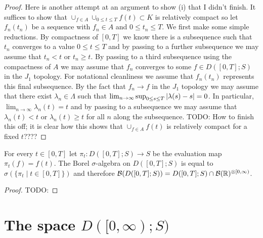 \begin{proof}
Here is another attempt at an argument to show (i) that I didn't finish.  It suffices to show that $\cup_{f \in A} \cup_{0 \leq t \leq T} f(t) \subset K$ is relatively compact so let $f_n(t_n)$ be a sequence with $f_n \in A$ and $0 \leq t_n \leq T$.  We first make some simple reductions.  By compactness of $[0,T]$ we know there is a subsequence such that $t_n$ converges to a value $0 \leq t \leq T$ and by passing to a further subsequence we may assume that $t_n < t$ or $t_n \geq t$.  By passing to a third subsequence using the compactness of $A$ we may assume that $f_n$ converges to some $f \in D([0,T];S)$ in the $J_1$ topology.  For notational cleanliness we assume that $f_n(t_n)$ represents this final subsequence.  By the fact that $f_n \to f$ in the $J_1$ topology we may assume that there exist $\lambda_n \in \Lambda$ such that $\lim_{n \to \infty} \sup_{0 \leq s \leq T} \left \vert \lambda(s) - s \right \vert = 0$.  In particular, $\lim_{n \to \infty} \lambda_n(t) = t$ and by passing to a subsequence we may assume that $\lambda_n(t) < t$ or $\lambda_n(t) \geq t$ for all $n$ along the subsequence.   TODO: How to finish this off; it is clear how this shows that $\cup_{f \in A} f(t)$ is relatively compact for a fixed $t$????
\end{proof}

\begin{lem}\label{SkorohodBorelGeneratedByProjections}For every $t \in [0,T]$ let $\pi_t : D([0,T];S) \to
  S$ be the evaluation map $\pi_t(f) = f(t)$.  The Borel $\sigma$-algebra on $D([0,T]; S)$ is
  equal to $\sigma(\lbrace \pi_t \mid t \in [0,T] \rbrace)$ and
  therefore $\mathcal{B}(D([0,T]; S)) = D([0,T];
  S) \cap \mathcal{B}(\mathbb{R})^{\otimes [0,\infty)}$.
\end{lem}
\begin{proof}
TODO:
\end{proof}


\section{The space $D([0,\infty); S)$}

